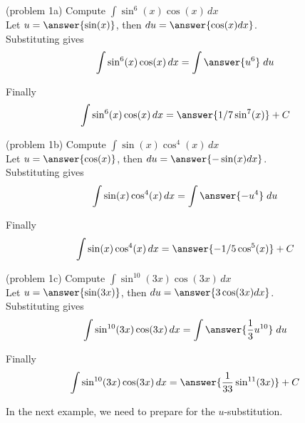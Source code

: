 \documentclass{ximera}
\begin{document}
\begin{problem}(problem 1a) 
Compute $\displaystyle{\int \sin^6(x)\cos(x) \, dx}$\\

Let $u = \answer{\sin(x)}$, \; then $du = \answer{\cos(x) dx}$.\\

Substituting gives
\[
\int \sin^6(x)\cos(x) \, dx = \int \answer{u^6} \; du
\]

Finally
\[
\int \sin^{6}(x)\cos(x) \, dx = \answer{1/7 \sin^7(x)} + C
\]

\end{problem}



\begin{problem}(problem 1b) 
Compute $\displaystyle{\int \sin(x)\cos^4(x) \, dx}$\\

Let $u = \answer{\cos(x)}$, \; then $du = \answer{-\sin(x) dx}$.\\

Substituting gives 
\[
\int \sin(x)\cos^4(x) \, dx = \int \answer{-u^4} \; du
\]

Finally 
\[
\int \sin(x)\cos^4(x) \, dx = \answer{-1/5 \cos^5(x)} + C
\]

\end{problem}



\begin{problem}(problem 1c)
Compute $\displaystyle{\int \sin^{10}(3x)\cos(3x) \, dx}$\\

Let $u = \answer{\sin(3x)}$, \; then $du = \answer{3\cos(3x) dx}$.\\

Substituting gives 
\[
\int \sin^{10}(3x)\cos(3x) \, dx = \int \answer{\frac13 u^{10}} \; du
\]

Finally
\[
\int \sin^{10}(3x)\cos(3x) \, dx = \answer{\frac{1}{33} \sin^{11}(3x)} + C
\]

\end{problem}



In the next example, we need to prepare for the $u$-substitution. 
\end{document}
